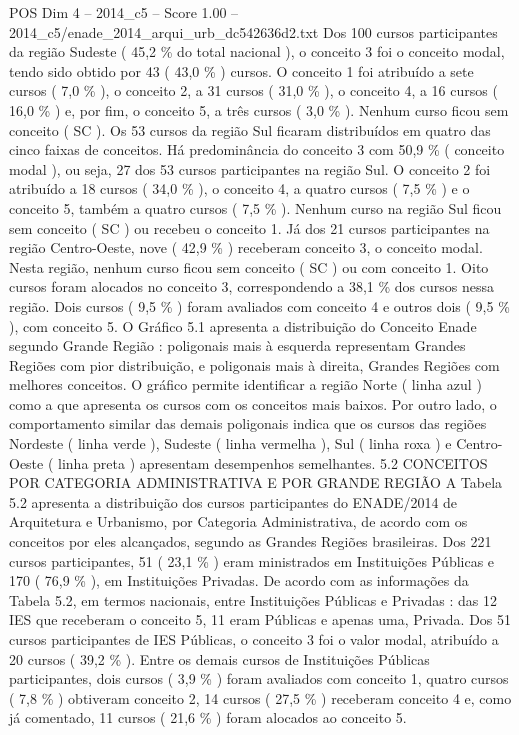 \begin{textsample}{POS Dim 4 – 2014\_c5 – Score 1.00 – 2014\_c5/enade\_2014\_arqui\_urb\_dc542636d2.txt}
Dos 100 cursos participantes da região Sudeste ( 45,2 \% do total nacional ), o conceito 3 foi o conceito modal, tendo sido obtido por 43 ( 43,0 \% ) cursos.
O conceito 1 foi atribuído a sete cursos ( 7,0 \% ), o conceito 2, a 31 cursos ( 31,0 \% ), o conceito 4, a 16 cursos ( 16,0 \% ) e, por fim, o conceito 5, a três cursos ( 3,0 \% ).
Nenhum curso ficou sem conceito ( SC ).
Os 53 cursos da região Sul ficaram distribuídos em quatro das cinco faixas de conceitos.
Há predominância do conceito 3 com 50,9 \% ( conceito modal ), ou seja, 27 dos 53 cursos participantes na região Sul.
O conceito 2 foi atribuído a 18 cursos ( 34,0 \% ), o conceito 4, a quatro cursos ( 7,5 \% ) e o conceito 5, também a quatro cursos ( 7,5 \% ).
Nenhum curso na região Sul ficou sem conceito ( SC ) ou recebeu o conceito 1.
Já dos 21 cursos participantes na região Centro-Oeste, nove ( 42,9 \% ) receberam conceito 3, o conceito modal.
Nesta região, nenhum curso ficou sem conceito ( SC ) ou com conceito 1.
Oito cursos foram alocados no conceito 3, correspondendo a 38,1 \% dos cursos nessa região.
Dois cursos ( 9,5 \% ) foram avaliados com conceito 4 e outros dois ( 9,5 \% ), com conceito 5.
O Gráfico 5.1 apresenta a distribuição do Conceito Enade segundo Grande Região : poligonais mais à esquerda representam Grandes Regiões com pior distribuição, e poligonais mais à direita, Grandes Regiões com melhores conceitos.
O gráfico permite identificar a região Norte ( linha azul ) como a que apresenta os cursos com os conceitos mais baixos.
Por outro lado, o comportamento similar das demais poligonais indica que os cursos das regiões Nordeste ( linha verde ), Sudeste ( linha vermelha ), Sul ( linha roxa ) e Centro-Oeste ( linha preta ) apresentam desempenhos semelhantes. 5.2 CONCEITOS POR CATEGORIA ADMINISTRATIVA E POR GRANDE REGIÃO A Tabela 5.2 apresenta a distribuição dos cursos participantes do ENADE/2014 de Arquitetura e Urbanismo, por Categoria Administrativa, de acordo com os conceitos por eles alcançados, segundo as Grandes Regiões brasileiras.
Dos 221 cursos participantes, 51 ( 23,1 \% ) eram ministrados em Instituições Públicas e 170 ( 76,9 \% ), em Instituições Privadas.
De acordo com as informações da Tabela 5.2, em termos nacionais, entre Instituições Públicas e Privadas : das 12 IES que receberam o conceito 5, 11 eram Públicas e apenas uma, Privada.
Dos 51 cursos participantes de IES Públicas, o conceito 3 foi o valor modal, atribuído a 20 cursos ( 39,2 \% ).
Entre os demais cursos de Instituições Públicas participantes, dois cursos ( 3,9 \% ) foram avaliados com conceito 1, quatro cursos ( 7,8 \% ) obtiveram conceito 2, 14 cursos ( 27,5 \% ) receberam conceito 4 e, como já comentado, 11 cursos ( 21,6 \% ) foram alocados ao conceito 5.

\end{textsample}
